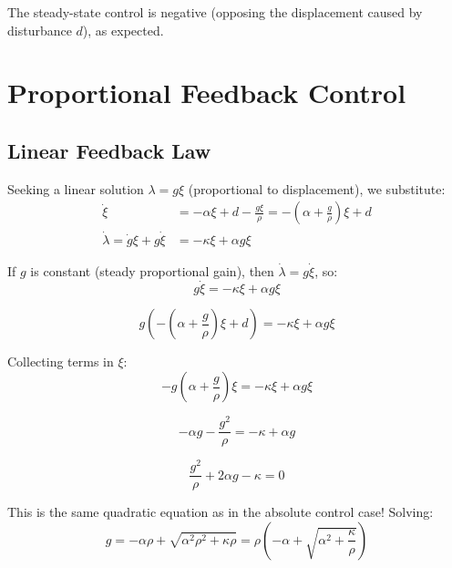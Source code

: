 \documentclass[12pt]{article}
\begin{document}
The steady-state control is negative (opposing the displacement caused by disturbance $d$), as expected.

\section{Proportional Feedback Control}

\subsection{Linear Feedback Law}

Seeking a linear solution $\lambda = g \xi$ (proportional to displacement), we substitute:
\begin{align}
\dot{\xi} &= -\alpha \xi + d - \frac{g \xi}{\rho} = -\left(\alpha + \frac{g}{\rho}\right) \xi + d \\
\dot{\lambda} = \dot{g}\xi + g\dot{\xi} &= -\kappa \xi + \alpha g \xi
\end{align}

If $g$ is constant (steady proportional gain), then $\dot{\lambda} = g \dot{\xi}$, so:
\begin{equation}
g \dot{\xi} = -\kappa \xi + \alpha g \xi
\end{equation}

\begin{equation}
g \left( -\left(\alpha + \frac{g}{\rho}\right) \xi + d \right) = -\kappa \xi + \alpha g \xi
\end{equation}

Collecting terms in $\xi$:
\begin{equation}
-g\left(\alpha + \frac{g}{\rho}\right) \xi = -\kappa \xi + \alpha g \xi
\end{equation}

\begin{equation}
-\alpha g - \frac{g^2}{\rho} = -\kappa + \alpha g
\end{equation}

\begin{equation}
\frac{g^2}{\rho} + 2\alpha g - \kappa = 0
\end{equation}

This is the same quadratic equation as in the absolute control case! Solving:
\begin{equation}
g = -\alpha \rho + \sqrt{\alpha^2 \rho^2 + \kappa \rho} = \rho \left( -\alpha + \sqrt{\alpha^2 + \frac{\kappa}{\rho}} \right)
\end{equation}
\end{document}
